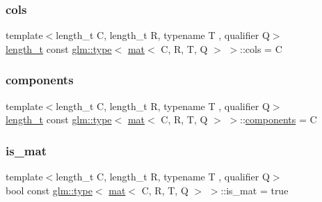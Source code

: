 \subsubsection{\texorpdfstring{cols}{cols}}
{\footnotesize\ttfamily template$<$length\+\_\+t C, length\+\_\+t R, typename T , qualifier Q$>$ \\
\mbox{\hyperlink{namespaceglm_a090a0de2260835bee80e71a702492ed9}{length\+\_\+t}} const \mbox{\hyperlink{structglm_1_1type}{glm\+::type}}$<$ \mbox{\hyperlink{structglm_1_1mat}{mat}}$<$ C, R, T, Q $>$ $>$\+::cols = C\hspace{0.3cm}{\ttfamily [static]}}

\mbox{\label{structglm_1_1type_3_01mat_3_01_c_00_01_r_00_01_t_00_01_q_01_4_01_4_a4f440364136d8fa3a62b2e1bfff81a01}} 
\subsubsection{\texorpdfstring{components}{components}}
{\footnotesize\ttfamily template$<$length\+\_\+t C, length\+\_\+t R, typename T , qualifier Q$>$ \\
\mbox{\hyperlink{namespaceglm_a090a0de2260835bee80e71a702492ed9}{length\+\_\+t}} const \mbox{\hyperlink{structglm_1_1type}{glm\+::type}}$<$ \mbox{\hyperlink{structglm_1_1mat}{mat}}$<$ C, R, T, Q $>$ $>$\+::\mbox{\hyperlink{_s_d_l__opengl__glext_8h_a3824c86dfa50d23068c74eafb87375c2}{components}} = C\hspace{0.3cm}{\ttfamily [static]}}

\mbox{\label{structglm_1_1type_3_01mat_3_01_c_00_01_r_00_01_t_00_01_q_01_4_01_4_a8fb529c47b93fcd9c446bb960d6e1fc9}} 
\subsubsection{\texorpdfstring{is\+\_\+mat}{is\_mat}}
{\footnotesize\ttfamily template$<$length\+\_\+t C, length\+\_\+t R, typename T , qualifier Q$>$ \\
bool const \mbox{\hyperlink{structglm_1_1type}{glm\+::type}}$<$ \mbox{\hyperlink{structglm_1_1mat}{mat}}$<$ C, R, T, Q $>$ $>$\+::is\+\_\+mat = true\hspace{0.3cm}{\ttfamily [static]}}

